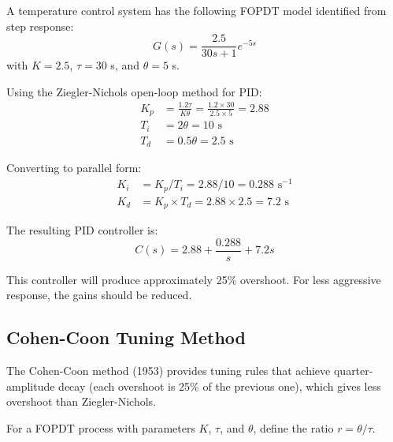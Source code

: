 
\begin{example}
\label{ex:zn_tuning}
A temperature control system has the following FOPDT model identified from step response:
\begin{equation}
G(s) = \frac{2.5}{30s + 1} e^{-5s}
\end{equation}
with $K = 2.5$, $\tau = 30$ s, and $\theta = 5$ s.

Using the Ziegler-Nichols open-loop method for PID:
\begin{align}
K_p &= \frac{1.2 \tau}{K \theta} = \frac{1.2 \times 30}{2.5 \times 5} = 2.88 \\
T_i &= 2\theta = 10 \text{ s} \\
T_d &= 0.5\theta = 2.5 \text{ s}
\end{align}

Converting to parallel form:
\begin{align}
K_i &= K_p / T_i = 2.88 / 10 = 0.288 \text{ s}^{-1} \\
K_d &= K_p \times T_d = 2.88 \times 2.5 = 7.2 \text{ s}
\end{align}

The resulting PID controller is:
\begin{equation}
C(s) = 2.88 + \frac{0.288}{s} + 7.2s
\end{equation}

This controller will produce approximately 25\% overshoot. For less aggressive response, the gains should be reduced.
\end{example}

\subsection{Cohen-Coon Tuning Method}
\label{subsec:cohen_coon}

The Cohen-Coon method (1953) provides tuning rules that achieve quarter-amplitude decay (each overshoot is 25\% of the previous one), which gives less overshoot than Ziegler-Nichols.

For a FOPDT process with parameters $K$, $\tau$, and $\theta$, define the ratio $r = \theta / \tau$.

